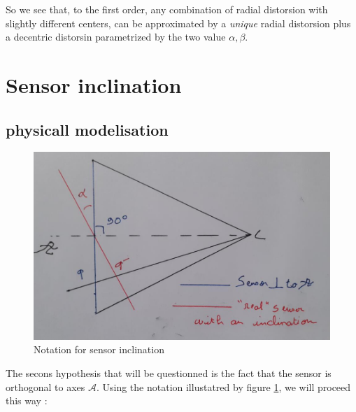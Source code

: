 So we see that, to the first order, any combination of radial distorsion with slightly different centers,
can be approximated by a \emph{unique} radial distorsion plus a decentric distorsin parametrized by the two value $\alpha,\beta$.




\section{Sensor inclination}


\subsection{physicall modelisation}

\begin{figure}
\centering
\includegraphics[width=12cm]{Methods/Images/PlanIncl.jpg}\caption{Notation for sensor inclination}
	\label{fig:PlaneIncl}
\end{figure}

The secons hypothesis  that will be questionned is the fact that the sensor is 
orthogonal to axes $\mathcal{A}$.  Using the notation illustatred by 
figure \ref{fig:PlaneIncl}, we will proceed this way :

